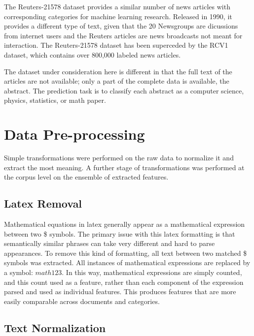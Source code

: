 \documentclass[10pt,twocolumn]{article}
\begin{document}
The Reuters-21578 dataset provides a similar number of news articles with corresponding categories for machine learning research.  Released in 1990, it provides a different type of text, given that the 20 Newsgroups are dicussions from internet users and the Reuters articles are news broadcasts not meant for interaction.  The Reuters-21578 dataset has been superceded by the RCV1 dataset, which contains over 800,000 labeled news articles.

The dataset under consideration here is different in that the full text of the articles are not available; only a part of the complete data is available, the abstract.  The prediction task is to classify each abstract as a computer science, physics, statistics, or math paper.

\section*{Data Pre-processing}

Simple transformations were performed on the raw data to normalize it and extract the most meaning. A further stage of transformations was performed at the corpus level on the ensemble of extracted features.

\subsection*{Latex Removal}

Mathematical equations in latex generally appear as a mathematical expression between two \$ symbols. The primary issue with this latex formatting is that semantically similar phrases can take very different and hard to parse appearances. To remove this kind of formatting, all text between two matched \$ symbols was extracted. All instances of mathematical expressions are replaced by a symbol: $math123$. In this way, mathematical expressions are simply counted, and this count used as a feature, rather than each component of the expression parsed and used as individual features.  This produces features that are more easily comparable across documents and categories.

\subsection*{Text Normalization}
\end{document}
